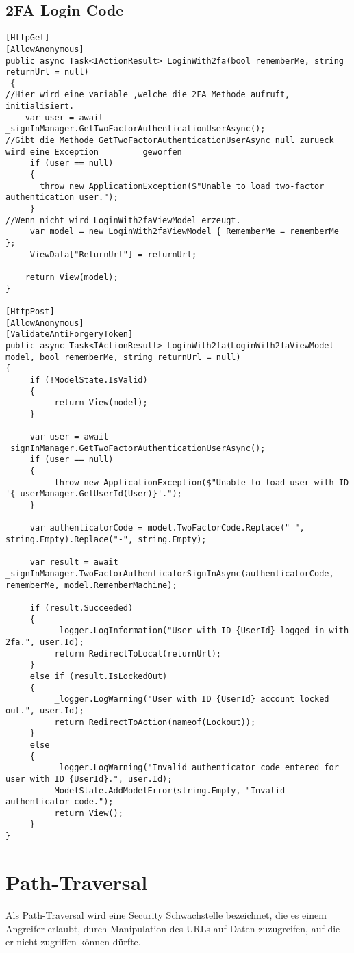 \subsection{2FA Login Code}
\label{sec:2FALogin}
\begin{lstlisting}
[HttpGet]
[AllowAnonymous]
public async Task<IActionResult> LoginWith2fa(bool rememberMe, string returnUrl = null)
 {
//Hier wird eine variable ,welche die 2FA Methode aufruft, initialisiert.
    var user = await _signInManager.GetTwoFactorAuthenticationUserAsync();
//Gibt die Methode GetTwoFactorAuthenticationUserAsync null zurueck wird eine Exception 	    geworfen
     if (user == null)
     {
       throw new ApplicationException($"Unable to load two-factor authentication user.");
     }
//Wenn nicht wird LoginWith2faViewModel erzeugt.
     var model = new LoginWith2faViewModel { RememberMe = rememberMe };
     ViewData["ReturnUrl"] = returnUrl;

    return View(model);
}

[HttpPost]
[AllowAnonymous]
[ValidateAntiForgeryToken]
public async Task<IActionResult> LoginWith2fa(LoginWith2faViewModel model, bool rememberMe, string returnUrl = null)
{
     if (!ModelState.IsValid)
     {
          return View(model);
     }

     var user = await _signInManager.GetTwoFactorAuthenticationUserAsync();
     if (user == null)
     {
          throw new ApplicationException($"Unable to load user with ID '{_userManager.GetUserId(User)}'.");
     }

     var authenticatorCode = model.TwoFactorCode.Replace(" ", string.Empty).Replace("-", string.Empty);

     var result = await _signInManager.TwoFactorAuthenticatorSignInAsync(authenticatorCode, rememberMe, model.RememberMachine);

     if (result.Succeeded)
     {
          _logger.LogInformation("User with ID {UserId} logged in with 2fa.", user.Id);
          return RedirectToLocal(returnUrl);
     }
     else if (result.IsLockedOut)
     {
          _logger.LogWarning("User with ID {UserId} account locked out.", user.Id);
          return RedirectToAction(nameof(Lockout));
     }
     else
     {
          _logger.LogWarning("Invalid authenticator code entered for user with ID {UserId}.", user.Id);
          ModelState.AddModelError(string.Empty, "Invalid authenticator code.");
          return View();
     }
}
\end{lstlisting}
\section{Path-Traversal}
\label{sec:Path-Traversal}
Als Path-Traversal wird eine Security Schwachstelle bezeichnet, die es einem Angreifer erlaubt, durch Manipulation des URLs auf Daten zuzugreifen, auf die er nicht zugriffen können dürfte. 
